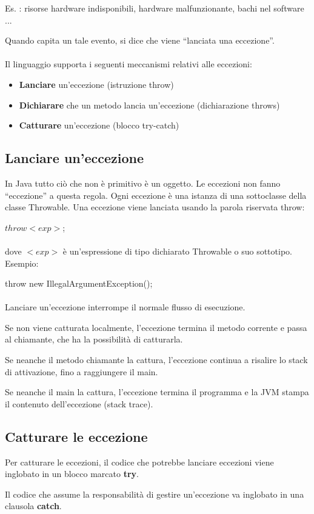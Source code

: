 \documentclass[10pt]{article}
\begin{document}
Es. : risorse hardware indisponibili, hardware malfunzionante,
bachi nel software ...

Quando capita un tale evento, si dice che viene “lanciata una
eccezione”.\\\\
Il linguaggio supporta i seguenti meccanismi relativi alle eccezioni:
\begin{itemize}
    \item \textbf{Lanciare} un’eccezione (istruzione throw)
    \item \textbf{Dichiarare} che un metodo lancia un’eccezione (dichiarazione throws)
    \item \textbf{Catturare} un’eccezione (blocco try-catch)
\end{itemize}
\subsection{Lanciare un'eccezione}
In Java tutto ciò che non è primitivo è un oggetto. Le eccezioni
non fanno “eccezione” a questa regola.
Ogni eccezione è una istanza di una sottoclasse della classe Throwable.
Una eccezione viene lanciata usando la parola riservata throw:

$throw <exp>$;\\\\
dove  $<exp>$ è un’espressione di tipo dichiarato Throwable o suo sottotipo.\\
Esempio:

throw new IllegalArgumentException();\\\\
Lanciare un’eccezione interrompe il normale flusso di esecuzione.

Se non viene catturata localmente, l’eccezione termina il metodo
corrente e passa al chiamante, che ha la possibilità di catturarla.

Se neanche il metodo chiamante la cattura, l’eccezione continua
a risalire lo stack di attivazione, fino a raggiungere il main.

Se neanche il main la cattura, l’eccezione termina il programma e
la JVM stampa il contenuto dell’eccezione (stack trace).
\subsection{Catturare le eccezione}
Per catturare le eccezioni, il codice che potrebbe lanciare
eccezioni viene inglobato in un blocco marcato \textbf{try}.

Il codice che assume la responsabilità di gestire un’eccezione va
inglobato in una clausola \textbf{catch}.
\end{document}
